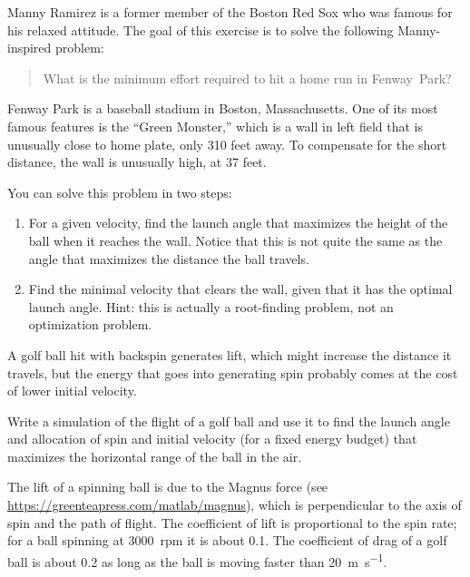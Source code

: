 \begin{ex}


Manny Ramirez is a former member of the Boston Red Sox who was famous for his relaxed attitude.  The goal of this exercise is to solve the following Manny-inspired problem:

\begin{quote}
What is the minimum effort required to hit a home run in Fenway~Park?
\end{quote}


Fenway Park is a baseball stadium in Boston, Massachusetts.  One of its most famous features is the ``Green Monster,'' which is a wall in left field that is unusually close to home plate, only 310 feet away.  To compensate for the short distance, the wall is unusually high, at 37 feet.


You can solve this problem in two steps:

\begin{enumerate}

\item For a given velocity, find the launch angle that maximizes the height of the ball when it reaches the wall.  Notice that this is not quite the same as the angle that maximizes the distance the ball travels.


\item Find the minimal velocity that clears the wall, given that it has the optimal launch angle.  Hint: this is actually a root-finding problem, not an optimization problem.

\end{enumerate}

\end{ex}


\begin{ex}
\label{golf}


A golf ball hit with backspin generates lift, which might increase the distance it travels, but the energy that goes into generating spin probably comes at the cost of lower initial velocity.

Write a simulation of the flight of a golf ball and use it to find
the launch angle and allocation of spin and initial velocity
(for a fixed energy budget) that maximizes the horizontal range of the
ball in the air.

The lift of a spinning ball is due to the Magnus force (see
\url{https://greenteapress.com/matlab/magnus}), which is
perpendicular to the axis of spin and the path of flight.  The
coefficient of lift is proportional to the spin rate; for a ball
spinning at 3000~rpm it is about 0.1.  The coefficient of drag of a
golf ball is about 0.2 as long as the ball is moving faster than \SI{20}{\meter\per\second}.

\end{ex}
